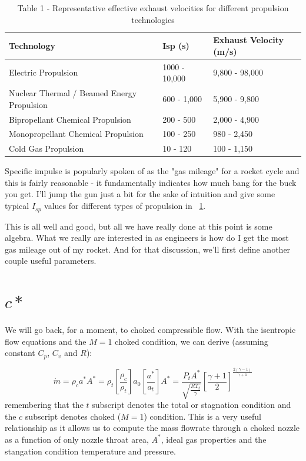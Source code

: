 \documentclass[twocolumn]{memoir} %
\begin{document}
\begin{table}[h]
    \centering
    \begin{tabular}{lll}
    \toprule
    Technology                    & Isp (s)        & Exhaust Velocity (m/s)  \\
    \midrule
    Electric Propulsion           & 1000 - 10,000  & 9,800 - 98,000  \\
    Nuclear Thermal / Beamed Energy Propulsion & 600 - 1,000  & 5,900 - 9,800  \\
    Bipropellant Chemical Propulsion           & 200 - 500    & 2,000 - 4,900  \\
    Monopropellant Chemical Propulsion         & 100 - 250    & 980 - 2,450  \\
    Cold Gas Propulsion                        & 10 - 120     & 100 - 1,150  \\
    \bottomrule
    \end{tabular}
\caption{Table 1 - Representative effective exhaust velocities for different propulsion technologies}
\label{t:tech_c}
\end{table}

Specific impulse is popularly spoken of as the "gas mileage" for a
rocket cycle and this is fairly reasonable - it fundamentally indicates
how much bang for the buck you get. I'll jump the gun just a bit for the
sake of intuition and give some typical $I_{sp}$ values for different
types of propulsion in ~\cref{t:tech_c}.

This is all well and good, but all we have really done at this point is
some algebra. What we really are interested in as engineers is how do I
get the most gas mileage out of my rocket. And for that discussion,
we'll first define another couple useful parameters.

\section{$c*$}\label{c}

We will go back, for a moment, to choked compressible flow. With the
isentropic flow equations and the $M=1$ choked condition, we can
derive (assuming constant $C_p$, $C_v$ and $R$):

\begin{equation}\dot{m} = \rho_c a^* A^*  = \rho_t \left[ \frac{\rho_c}{\rho_t}\right]a_0 \left[ \frac{a^*}{a_t}\right]A^* = \frac{P_t A^*}{\sqrt{\frac{R T_t}{\gamma}}} \left[\frac{\gamma + 1}{2}\right]^{\frac{2(\gamma-1)}{\gamma+1}}
\end{equation}
%
remembering that the $t$ subscript denotes the total or stagnation
condition and the $c$ subscript denotes choked ($M=1$) condition.
This is a very useful relationship as it allows us to compute the mass
flowrate through a choked nozzle as a function of only nozzle throat
area, $A^*$, ideal gas properties and the stangation condition
temperature and pressure.
\end{document}
